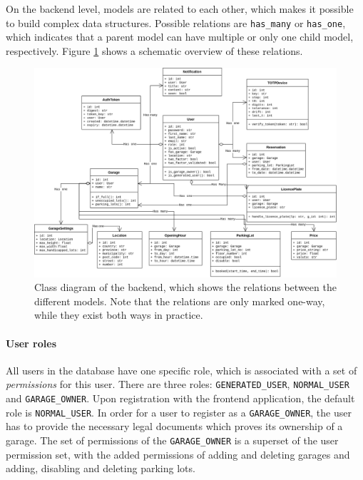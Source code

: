 \ind On the backend level, models are related to each other, which makes it possible to build complex data structures. Possible relations are \verb|has_many| or \verb|has_one|, which indicates that a parent model can have multiple or only one child model, respectively. Figure \ref{fig:class_diagram} shows a schematic overview of these relations. 

\begin{figure}
    \centering
    \includegraphics[width=14cm]{images/misc/class_diagram.drawio.png}
    \caption[Class diagram of the backend.]{Class diagram of the backend, which shows the relations between the different models. Note that the relations are only marked one-way, while they exist both ways in practice.}
    \label{fig:class_diagram}
\end{figure}

\paragraph{User roles}\label{sec:backend-roles}
All users in the database have one specific role, which is associated with a set of \textit{permissions} for this user. There are three roles: \verb|GENERATED_USER|, \verb|NORMAL_USER| and \verb|GARAGE_OWNER|. Upon registration with the frontend application, the default role is \verb|NORMAL_USER|. In order for a user to register as a \verb|GARAGE_OWNER|, the user has to provide the necessary legal documents which proves its ownership of a garage. The set of permissions of the \verb|GARAGE_OWNER| is a superset of the user permission set, with the added permissions of adding and deleting garages and adding, disabling and deleting parking lots.

